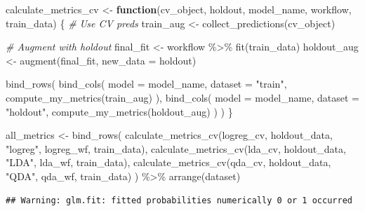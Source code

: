 \documentclass[
]{article}
\newenvironment{Shaded}{\begin{snugshade}}{\end{snugshade}}
\newcommand{\AttributeTok}[1]{\textcolor[rgb]{0.77,0.63,0.00}{#1}}
\newcommand{\CommentTok}[1]{\textcolor[rgb]{0.56,0.35,0.01}{\textit{#1}}}
\newcommand{\ControlFlowTok}[1]{\textcolor[rgb]{0.13,0.29,0.53}{\textbf{#1}}}
\newcommand{\FunctionTok}[1]{\textcolor[rgb]{0.00,0.00,0.00}{#1}}
\newcommand{\NormalTok}[1]{#1}
\newcommand{\OtherTok}[1]{\textcolor[rgb]{0.56,0.35,0.01}{#1}}
\newcommand{\SpecialCharTok}[1]{\textcolor[rgb]{0.00,0.00,0.00}{#1}}
\newcommand{\StringTok}[1]{\textcolor[rgb]{0.31,0.60,0.02}{#1}}
\begin{document}
\begin{Shaded}
\begin{Highlighting}[]
\NormalTok{calculate\_metrics\_cv }\OtherTok{\textless{}{-}} \ControlFlowTok{function}\NormalTok{(cv\_object, holdout, model\_name, workflow, train\_data) \{}
  \CommentTok{\# Use CV preds}
\NormalTok{  train\_aug }\OtherTok{\textless{}{-}} \FunctionTok{collect\_predictions}\NormalTok{(cv\_object)}
  
  \CommentTok{\# Augment with holdout}
\NormalTok{  final\_fit   }\OtherTok{\textless{}{-}}\NormalTok{ workflow }\SpecialCharTok{\%\textgreater{}\%} \FunctionTok{fit}\NormalTok{(train\_data)}
\NormalTok{  holdout\_aug }\OtherTok{\textless{}{-}} \FunctionTok{augment}\NormalTok{(final\_fit, }\AttributeTok{new\_data =}\NormalTok{ holdout)}
  
  \FunctionTok{bind\_rows}\NormalTok{(}
    \FunctionTok{bind\_cols}\NormalTok{(}
      \AttributeTok{model   =}\NormalTok{ model\_name,}
      \AttributeTok{dataset =} \StringTok{"train"}\NormalTok{,}
      \FunctionTok{compute\_my\_metrics}\NormalTok{(train\_aug)}
\NormalTok{    ),}
    \FunctionTok{bind\_cols}\NormalTok{(}
      \AttributeTok{model   =}\NormalTok{ model\_name,}
      \AttributeTok{dataset =} \StringTok{"holdout"}\NormalTok{,}
      \FunctionTok{compute\_my\_metrics}\NormalTok{(holdout\_aug)}
\NormalTok{    )}
\NormalTok{  )}
\NormalTok{\}}
\end{Highlighting}
\end{Shaded}

\begin{Shaded}
\begin{Highlighting}[]
\NormalTok{all\_metrics }\OtherTok{\textless{}{-}} \FunctionTok{bind\_rows}\NormalTok{(}
    \FunctionTok{calculate\_metrics\_cv}\NormalTok{(logreg\_cv, holdout\_data, }\StringTok{"logreg"}\NormalTok{, logreg\_wf, train\_data),}
    \FunctionTok{calculate\_metrics\_cv}\NormalTok{(lda\_cv, holdout\_data, }\StringTok{"LDA"}\NormalTok{, lda\_wf, train\_data),}
    \FunctionTok{calculate\_metrics\_cv}\NormalTok{(qda\_cv, holdout\_data, }\StringTok{"QDA"}\NormalTok{, qda\_wf, train\_data)}
\NormalTok{) }\SpecialCharTok{\%\textgreater{}\%} \FunctionTok{arrange}\NormalTok{(dataset)}
\end{Highlighting}
\end{Shaded}

\begin{verbatim}
## Warning: glm.fit: fitted probabilities numerically 0 or 1 occurred
\end{verbatim}
\end{document}
